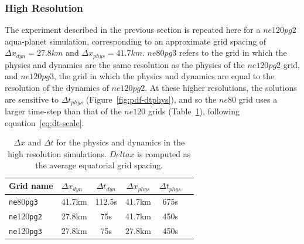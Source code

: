 \documentclass{agujournal}
\begin{document}
\subsubsection{High Resolution}\label{sec:hires}

The experiment described in the previous section is repeated here for a $ne120pg2$ aqua-planet simulation, corresponding to an approximate grid spacing of $\Delta x_{dyn} = 27.8km$ and $\Delta x_{phys} = 41.7km$. $ne80pg3$ refers to the grid in which the physics and dynamics are the same resolution as the physics of the $ne120pg2$ grid, and $ne120pg3$, the grid in which the physics and dynamics are equal to the resolution of the dynamics of $ne120pg2$. At these higher resolutions, the solutions are sensitive to $\Delta t_{phys}$ (Figure~\ref{fig:pdf-dtphys}), and so the $ne80$ grid uses a larger time-step than that of the $ne120$ grids (Table~\ref{table:grids-hi}), following equation~\eqref{eq:dt-scale}.

 \begin{table}
 \caption{$\Delta x$ and $\Delta t$ for the physics and dynamics in the high resolution simulations. $Delta x$ is computed as the average equatorial grid spacing.}
 \centering
 \begin{tabular}{llcccc}
 \hline
 Grid name & $\Delta x_{dyn}$  & $\Delta t_{dyn}$ & $\Delta x_{phys}$  & $\Delta t_{phys}$ \\
 \hline
   {\tt{ne}}80{\tt{pg3}}  & 41.7km & 112.5s  & 41.7km & 675s \\
   {\tt{ne}}120{\tt{pg2}}  & 27.8km & 75s  & 41.7km & 450s \\
   {\tt{ne}}120{\tt{pg3}}  & 27.8km & 75s  & 27.8km & 450s \\
 \hline
 \end{tabular}
 \label{table:grids-hi}
 \end{table}
 
\end{document}
